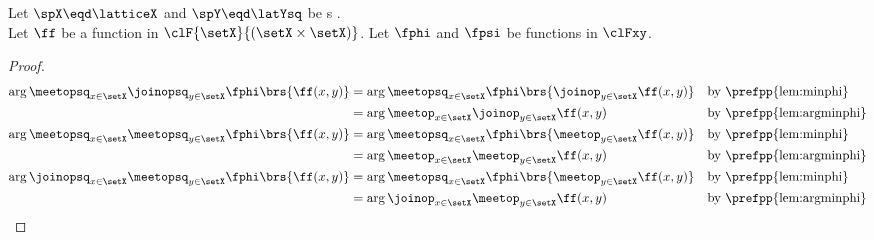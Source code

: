 \begin{lemma}
\label{lem:argminmaxphi}
Let $\spX\eqd\latticeX$ and $\spY\eqd\latYsq$ be s .
\\Let $\ff$ be a function in $\clF{\setX}{(\setX\times\setX)}$.
Let $\fphi$ and $\fpsi$ be functions in $\clFxy$.
\\
\end{lemma}
\begin{proof}
\begin{align*}
  \arg\meetopsq_{x\in\setX}\joinopsq_{y\in\setX} \fphi\brs{\ff(x,y)} 
    &= \arg\meetopsq_{x\in\setX}\fphi\brs{\joinop_{y\in\setX} \ff(x,y)} 
    && \text{by \prefpp{lem:minphi}}
  \\&= \arg\meetop_{x\in\setX}\joinop_{y\in\setX} \ff(x,y)
    && \text{by \prefpp{lem:argminphi}}
  \\
  \arg\meetopsq_{x\in\setX}\meetopsq_{y\in\setX} \fphi\brs{\ff(x,y)} 
    &= \arg\meetopsq_{x\in\setX}\fphi\brs{\meetop_{y\in\setX} \ff(x,y)} 
    && \text{by \prefpp{lem:minphi}}
  \\&= \arg\meetop_{x\in\setX}\meetop_{y\in\setX} \ff(x,y)
    && \text{by \prefpp{lem:argminphi}}
  \\
  \arg\joinopsq_{x\in\setX}\meetopsq_{y\in\setX} \fphi\brs{\ff(x,y)} 
    &= \arg\meetopsq_{x\in\setX}\fphi\brs{\meetop_{y\in\setX} \ff(x,y)} 
    && \text{by \prefpp{lem:minphi}}
  \\&= \arg\joinop_{x\in\setX}\meetop_{y\in\setX} \ff(x,y)
    && \text{by \prefpp{lem:argminphi}}
\end{align*}
\end{proof}


